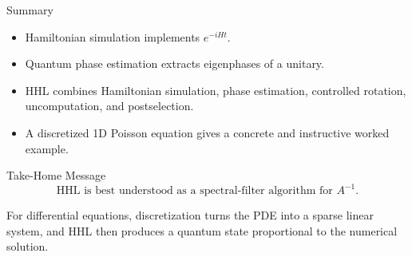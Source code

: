 \documentclass[aspectratio=169]{beamer}
\begin{document}
\begin{frame}{Summary}
\begin{itemize}
    \item Hamiltonian simulation implements \(e^{-iHt}\).
    \item Quantum phase estimation extracts eigenphases of a unitary.
    \item HHL combines Hamiltonian simulation, phase estimation, controlled rotation, uncomputation, and postselection.
    \item A discretized 1D Poisson equation gives a concrete and instructive worked example.
\end{itemize}
\end{frame}

\begin{frame}{Take-Home Message}
\[
\boxed{
\text{HHL is best understood as a spectral-filter algorithm for } A^{-1}.
}
\]

For differential equations, discretization turns the PDE into a sparse linear system, and HHL then produces a quantum state proportional to the numerical solution.
\end{frame}
\end{document}
